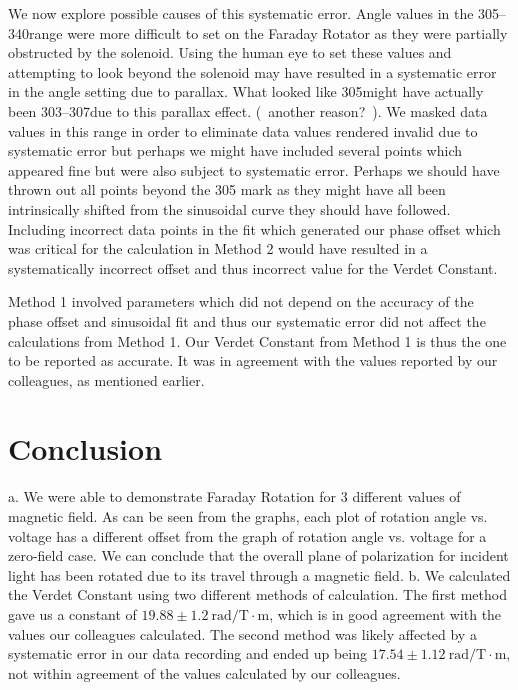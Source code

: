 \documentclass[prb,preprint]{revtex4-1}
\begin{document}
{{{{We now explore possible causes of this systematic error.  Angle values in the 305\degree--340\degree range were more difficult to set on the Faraday Rotator as they were partially obstructed by the solenoid.  Using the human eye to set these values and attempting to look beyond the solenoid may have resulted in a systematic error in the angle setting due to parallax.  What looked like 305\degree might have actually been 303\degree--307\degree due to this parallax effect.  (~another reason?~).  We masked data values in this range in order to eliminate data values rendered invalid due to systematic error but perhaps we might have included several points which appeared fine but were also subject to systematic error.  Perhaps we should have thrown out all points beyond the 305 \degree mark as they might have all been intrinsically shifted from the sinusoidal curve they should have followed.  Including incorrect data points in the fit which generated our phase offset which was critical for the calculation in Method 2 would have resulted in a systematically incorrect offset and thus incorrect value for the Verdet Constant.

Method 1 involved parameters which did not depend on the accuracy of the phase offset and sinusoidal fit and thus our systematic error did not affect the calculations from Method 1.  Our Verdet Constant from Method 1 is thus the one to be reported as accurate.  It was in agreement with the values reported by our colleagues, as mentioned earlier.

\section{Conclusion}
{a.  We were able to demonstrate Faraday Rotation for 3 different values of magnetic field.  As can be seen from the graphs, each plot of rotation angle vs. voltage has a different offset from the graph of rotation angle vs. voltage for a zero-field case.  We can conclude that the overall plane of polarization for incident light has been rotated due to its travel through a magnetic field.
b.  We calculated the Verdet Constant using two different methods of calculation.  The first method gave us a constant of $19.88 \pm 1.2 \mathrm{~rad/T} \cdot \textrm{m}$, which is in good agreement with the values our colleagues calculated.  The second method was likely affected by a systematic error in our data recording and ended up being $17.54 \pm 1.12 \mathrm{~rad/T} \cdot \textrm{m}$, not within agreement of the values calculated by our colleagues.

}}}}}
\end{document}
